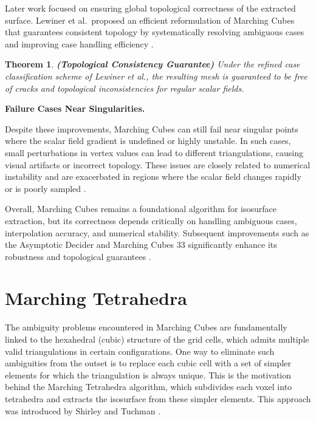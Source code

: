 \documentclass[12pt, a4paper, oneside]{book}
\theoremstyle{plain}
\newtheorem{theorem}{Theorem}[chapter]
\theoremstyle{definition}
\theoremstyle{remark}
\theoremstyle{definition}
\begin{document}
Later work focused on ensuring global topological correctness of the extracted surface.
Lewiner et al.\ proposed an efficient reformulation of Marching Cubes that guarantees
consistent topology by systematically resolving ambiguous cases and improving case
handling efficiency \cite{lewiner2003efficient}.

\begin{theorem}
    \textbf{(Topological Consistency Guarantee)}
Under the refined case classification scheme of Lewiner et al., the resulting mesh is
guaranteed to be free of cracks and topological inconsistencies for regular scalar fields.
\end{theorem}

\vspace{0.5em}

\textbf{Failure Cases Near Singularities.}

Despite these improvements, Marching Cubes can still fail near singular points where the
scalar field gradient is undefined or highly unstable. In such cases, small perturbations
in vertex values can lead to different triangulations, causing visual artifacts or
incorrect topology. These issues are closely related to numerical instability and are
exacerbated in regions where the scalar field changes rapidly or is poorly sampled
\cite{lorensen1998marching,lewiner2003efficient}.

\vspace{0.5em}

Overall, Marching Cubes remains a foundational algorithm for isosurface extraction, but
its correctness depends critically on handling ambiguous cases, interpolation accuracy,
and numerical stability. Subsequent improvements such as the Asymptotic Decider and
Marching Cubes 33 significantly enhance its robustness and topological guarantees
\cite{lorensen1998marching,nielson1991asymptotic,chernyaev1995mc33,lewiner2003mc}.

\section{Marching Tetrahedra}

The ambiguity problems encountered in Marching Cubes are fundamentally linked to the
hexahedral (cubic) structure of the grid cells, which admits multiple valid
triangulations in certain configurations. One way to eliminate such ambiguities from the
outset is to replace each cubic cell with a set of simpler elements for which the
triangulation is always unique. This is the motivation behind the Marching Tetrahedra
algorithm, which subdivides each voxel into tetrahedra and extracts the isosurface from
these simpler elements. This approach was introduced by Shirley and Tuchman
\cite{shirley1990marching}.
\end{document}
